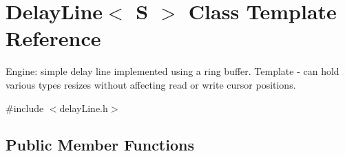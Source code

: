 \hypertarget{classDelayLine}{}\section{Delay\+Line$<$ S $>$ Class Template Reference}
\label{classDelayLine}


Engine\+: simple delay line implemented using a ring buffer. Template -\/ can hold various types resizes without affecting read or write cursor positions.  




{\ttfamily \#include $<$delay\+Line.\+h$>$}

\subsection*{Public Member Functions}

